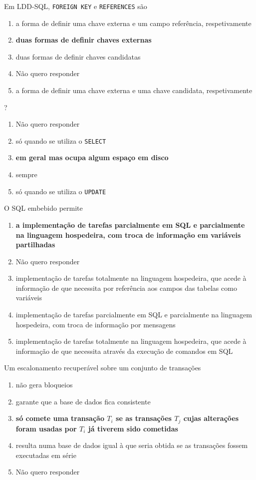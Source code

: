 \documentclass[type=recurso, year=2015/16]{bdad_exam}
\begin{document}
{
Em LDD-SQL, \texttt{FOREIGN KEY} e \texttt{REFERENCES} são
\begin{enumerate}[label=\alph*.]\itemsep0em
    \item a forma de definir uma chave externa e um campo referência, respetivamente
    \item \textbf{duas formas de definir chaves externas \greencheckmark}
    \item duas formas de definir chaves candidatas
    \item Não quero responder
    \item a forma de definir uma chave externa e uma chave candidata, respetivamente
\end{enumerate}

?
\begin{enumerate}[label=\alph*.]\itemsep0em
    \item Não quero responder
    \item só quando se utiliza o \texttt{SELECT}
    \item \textbf{em geral mas ocupa algum espaço em disco \greencheckmark}
    \item sempre
    \item só quando se utiliza o \texttt{UPDATE}
\end{enumerate}

O SQL embebido permite
\begin{enumerate}[label=\alph*.]\itemsep0em
    \item \textbf{a implementação de tarefas parcialmente em SQL e parcialmente na linguagem hospedeira, com troca de informação em variáveis partilhadas \greencheckmark}
    \item Não quero responder
    \item implementação de tarefas totalmente na linguagem hospedeira, que acede à informação de que necessita por referência aos campos das tabelas como variáveis
    \item implementação de tarefas parcialmente em SQL e parcialmente na linguagem hospedeira, com troca de informação por mensagens
    \item implementação de tarefas totalmente na linguagem hospedeira, que acede à informação de que necessita através da execução de comandos em SQL
\end{enumerate}

Um escalonamento recuperável sobre um conjunto de transações
\begin{enumerate}[label=\alph*.]\itemsep0em
    \item não gera bloqueios
    \item garante que a base de dados fica consistente
    \item \textbf{só comete uma transação $T_i$ se as transações $T_j$ cujas alterações foram usadas por $T_i$ já tiverem sido cometidas \greencheckmark}
    \item resulta numa base de dados igual à que seria obtida se as transações fossem executadas em série
    \item Não quero responder
\end{enumerate}

}
\end{document}
